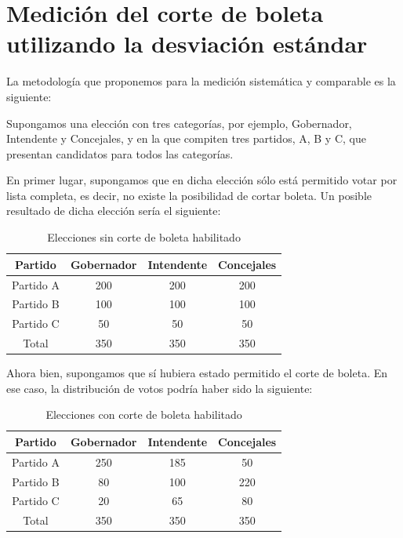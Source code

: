 \documentclass[12pt,a4paper]{article}
\begin{document}
\section{Medición del corte de boleta utilizando la desviación estándar}
La metodología que proponemos para la medición sistemática y comparable es la
siguiente:

Supongamos una elección con tres categorías, por ejemplo, Gobernador, Intendente
y Concejales, y en la que compiten tres partidos, A, B y C, que presentan
candidatos para todos las categorías.

En primer lugar, supongamos que en dicha elección sólo está permitido votar por
lista completa, es decir, no existe la posibilidad de cortar boleta. Un posible
resultado de dicha elección sería el siguiente:

\renewcommand{\arraystretch}{1.25}
\begin{table}[h!]
\centering
\begin{tabular}{c c c c} 
 Partido & Gobernador & Intendente & Concejales \\ [0.5ex] 
 \hline
Partido A & 200 & 200 & 200 \\
Partido B & 100 & 100 & 100 \\
Partido C & 50 & 50 & 50 \\
 \hline
Total & 350 & 350 & 350 \\ [1ex]
 \hline
\end{tabular}
\caption{Elecciones sin corte de boleta habilitado}
\label{table:1}
\end{table}

Ahora bien, supongamos que sí hubiera estado permitido el corte de boleta. En
ese caso, la distribución de votos podría haber sido la siguiente:

\renewcommand{\arraystretch}{1.25}
\begin{table}[h!]
\centering
\begin{tabular}{c c c c} 
 Partido & Gobernador & Intendente & Concejales \\ [0.5ex] 
 \hline
Partido A & 250 & 185 & 50 \\
Partido B & 80 & 100 & 220 \\
Partido C & 20 & 65 & 80 \\
 \hline
Total & 350 & 350 & 350 \\ [1ex]
 \hline
\end{tabular}
\caption{Elecciones con corte de boleta habilitado}
\label{table:1}
\end{table}
\end{document}
